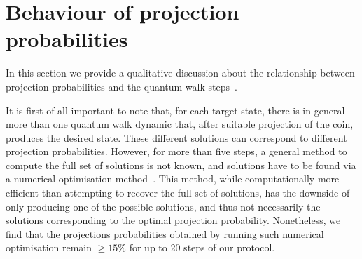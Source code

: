\section{Behaviour of projection probabilities}
\label{sec:expQWs:projection_probs}

In this section we provide a qualitative discussion about the relationship between projection probabilities and the quantum walk steps~\cite{innocenti2017quantum}.

It is first of all important to note that, for each target state, there is in general more than one quantum walk dynamic that, after suitable projection of the coin, produces the desired state.
These different solutions can correspond to different projection probabilities.
However, for more than five steps, a general method to compute the full set of solutions is not known, and solutions have to be found via a numerical optimisation method~\cite{innocenti2017quantum}.
This method, while computationally more efficient than attempting to recover the full set of solutions, has the downside of only producing one of the possible solutions, and thus not necessarily the solutions corresponding to the optimal projection probability.
Nonetheless, we find that the projections probabilities obtained by running such numerical optimisation remain $\ge 15\%$ for up to 20 steps of our protocol. 


